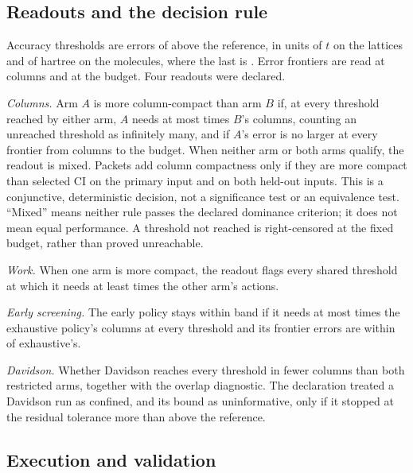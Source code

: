 \documentclass[aps,pra,reprint,superscriptaddress,nofootinbib,floatfix,
  showkeys,raggedbottom]{revtex4-2}
\begin{document}
\subsection{Readouts and the decision rule}

Accuracy thresholds are errors of \pkThresholdList{} above the reference, in
units of $t$ on the lattices and of hartree on the molecules, where the last is
\pkTightTarget{}. Error frontiers are read at \pkFrontierList{} columns and at
the budget. Four readouts were declared.

\emph{Columns.} Arm $A$ is more column-compact than arm $B$ if, at every
threshold reached by either arm, $A$ needs at most \pkCompactRatio{} times
$B$'s columns, counting an unreached threshold as infinitely many, and if $A$'s
error is no larger at every frontier from \pkFrontierMinimum{} columns to the
budget. When neither arm or both arms qualify, the readout is mixed. Packets
add column compactness only if they are more compact than selected CI on the
primary input and on both held-out inputs. This is a conjunctive,
deterministic decision, not a significance test or an equivalence test.
``Mixed'' means neither rule passes the declared dominance criterion; it does
not mean equal performance. A threshold not reached is right-censored at the
fixed budget, rather than proved unreachable.

\emph{Work.} When one arm is more compact, the readout flags every shared
threshold at which it needs at least \pkWorkRatio{} times the other arm's
actions.

\emph{Early screening.} The early policy stays within band if it needs at most
\pkEarlyColumnRatio{} times the exhaustive policy's columns at every threshold
and its frontier errors are within \pkEarlyFrontierBand{} of exhaustive's.

\emph{Davidson.} Whether Davidson reaches every threshold in fewer columns than
both restricted arms, together with the overlap diagnostic. The declaration
treated a Davidson run as confined, and its bound as uninformative, only if it
stopped at the residual tolerance more than \pkCompleteSpanTolerance{} above
the reference.

\subsection{Execution and validation}
\end{document}
